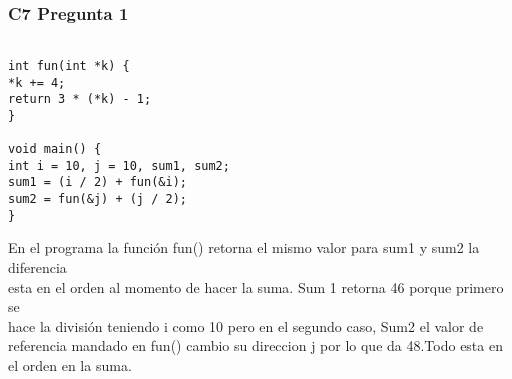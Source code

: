 \subsubsection{C7 Pregunta 1}
\begin{lstlisting}

int fun(int *k) {
*k += 4;
return 3 * (*k) - 1;
}

void main() {
int i = 10, j = 10, sum1, sum2;
sum1 = (i / 2) + fun(&i);
sum2 = fun(&j) + (j / 2);
}

 \end{lstlisting}
En el programa la función fun() retorna el mismo valor para sum1 y sum2 la diferencia \\
esta en el orden al momento de hacer la suma. Sum 1 retorna 46 porque primero se \\
hace la división teniendo i como 10 pero en el segundo caso, Sum2 el valor de referencia
mandado en fun() cambio su direccion j por lo que da 48.Todo esta en el orden en la suma.
